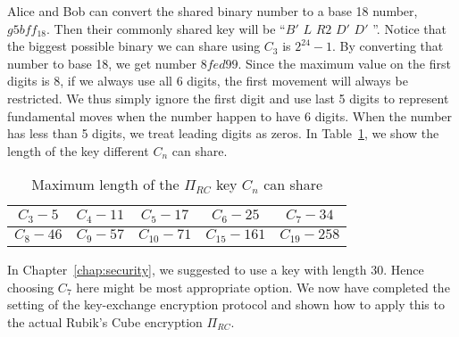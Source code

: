 Alice and Bob can convert the shared binary number to a base 18 number, $g5bff_{18}$. Then their commonly shared key will be ``$B'$ $L$ $R2$ $D'$ $D'$ ''. Notice that the biggest possible binary we can share using $C_3$ is $2^{24} - 1$. By converting that number to base 18, we get number $8fed99$. Since the maximum value on the first digits is 8, if we always use all 6 digits, the first movement will always be restricted. We thus simply ignore the first digit and use last 5 digits to represent fundamental moves when the number happen to have 6 digits. When the number has less than 5 digits, we treat leading digits as zeros. In Table~\ref{tab:share-length}, we show the length of the key different $C_n$ can share.
\begin{table}[ht]
    \centering
    \begin{tabular}{|c|c|c|c|c|}
        \hline $C_3 - 5$ & $C_4 - 11$ & $C_5 - 17$ & $C_6 - 25$ & $C_7 - 34$ \\
        \hline $C_8 - 46$ & $C_9 - 57$ & $C_{10} - 71$ & $C_{15} - 161$ & $C_{19} - 258$ \\ \hline
    \end{tabular}
    \caption{Maximum length of the $\Pi_{RC}$ key $C_n$ can share}
    \label{tab:share-length}
\end{table}
\par In Chapter~\ref{chap:security}, we suggested to use a key with length 30. Hence choosing $C_7$ here might be most appropriate option. We now have completed the setting of the key-exchange encryption protocol and shown how to apply this to the actual Rubik's Cube encryption $\Pi_{RC}$. 


